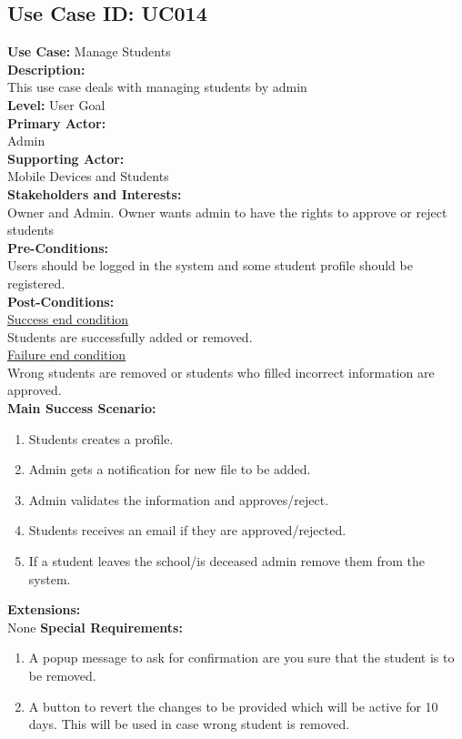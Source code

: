 \documentclass{report}
\begin{document}
\subsection{\textbf{Use Case ID:} UC014}
\textbf{Use Case:} Manage Students\\[0.3cm]
\textbf{Description:}\\
This use case deals with managing students by admin\\[0.3cm]
\textbf{Level:} User Goal\\[0.3cm]
\textbf{Primary Actor:}\\
Admin\\[0.3cm]
\textbf{Supporting Actor:}\\
Mobile Devices and Students\\[0.3cm]
\textbf{Stakeholders and Interests:}\\
Owner and  Admin. Owner wants admin to have the rights to approve or reject students\\[0.4cm]
\textbf{Pre-Conditions:}\\
Users should be logged in the system and some student profile should be registered.\\[0.3cm]
\textbf{Post-Conditions:}\\
\underline{Success end condition}\\
Students are successfully added or removed.\\[0.3cm]
\underline{Failure end condition}\\
Wrong students are removed or students who filled incorrect information are approved.\\[0.3cm]
\textbf{\large {Main Success Scenario:}}
\begin{enumerate}
    \item Students creates a profile.
    \item Admin gets a notification for new file to be added.
    \item Admin validates the information and approves/reject.
    \item Students receives an email if they are approved/rejected.
    \item If a student leaves the school/is deceased admin remove them from the system.
\end{enumerate}
\textbf{Extensions:}\\
None
\textbf{Special Requirements:}
\begin{enumerate}
    \item A popup message to ask for confirmation are you sure that the student is to be removed.
    \item A button to revert the changes to be provided which will be active for 10 days. This will be used in case wrong student is removed.
\end{enumerate}
\end{document}
